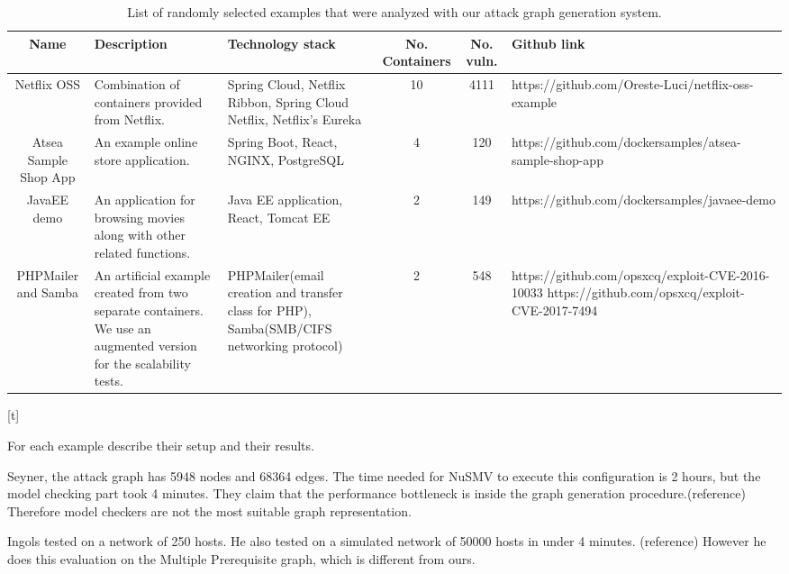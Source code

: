 \documentclass[letterpaper, 10 pt, conference]{ieeeconf}  %
\begin{document}
\begin{table}[t]
	\begin{center}
		\begin{tabular}{ |c|p{30mm}|p{20mm}|c|c|p{45mm}| } 
			\hline
			Name & Description & Technology stack & No. Containers & No. vuln. & Github link \\\hline 
			
			Netflix OSS & Combination of containers provided from Netflix. & Spring Cloud, Netflix Ribbon, Spring Cloud Netflix, Netflix's Eureka & 10 & 4111 & https://github.com/Oreste-Luci/netflix-oss-example \\\hline
			
			Atsea Sample Shop App & An example online store application. & Spring Boot, React, NGINX, PostgreSQL & 4 & 120 & https://github.com/dockersamples/atsea-sample-shop-app \\\hline
			
			JavaEE demo & An application for browsing movies along with other related functions. & Java EE application, React, Tomcat EE & 2 & 149 & https://github.com/dockersamples/javaee-demo \\\hline
			
			PHPMailer and Samba & An artificial example created from two separate containers. We use an augmented version for the scalability tests. & PHPMailer(email creation and transfer class for PHP), Samba(SMB/CIFS networking protocol) & 2 & 548 & https://github.com/opsxcq/exploit-CVE-2016-10033
			https://github.com/opsxcq/exploit-CVE-2017-7494 \\\hline
			
			
			\hline
		\end{tabular}
	\end{center}
	
	\caption{List of randomly selected examples that were analyzed with our attack graph generation system.}
	\label{table_technologies}
	
\end{table}[t]

For each example describe their setup and their results.

Seyner, the attack graph has 5948 nodes and 68364 edges. The time needed for NuSMV to execute this configuration is 2 hours, but the model checking part took 4 minutes. They claim that the performance bottleneck is inside the graph generation procedure.(reference) Therefore model checkers are not the most suitable graph representation.


Ingols tested on a network of 250 hosts. He also tested on a simulated network of 50000 hosts in under 4 minutes. (reference) However he does this evaluation on the Multiple Prerequisite graph, which is different from ours.
\end{document}
